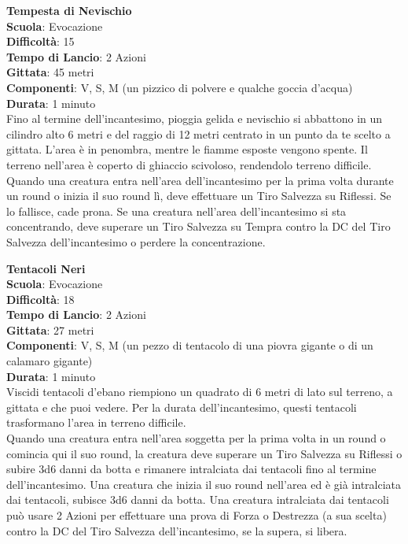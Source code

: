 \begin{multicols}{2}
\medskip\textbf{Tempesta di Nevischio}\\
\textbf{Scuola}: Evocazione\\
\textbf{Difficoltà}: 15\\
\textbf{Tempo di Lancio}: 2 Azioni\\
\textbf{Gittata}: 45 metri\\
\textbf{Componenti}: V, S, M (un pizzico di polvere e qualche goccia d'acqua)\\
\textbf{Durata}: 1 minuto\\
Fino al termine dell'incantesimo, pioggia gelida e nevischio si abbattono in un cilindro alto 6 metri e del raggio di 12 metri centrato in un punto da te scelto a gittata. L'area è in penombra, mentre le fiamme esposte vengono spente. Il terreno nell'area è coperto di ghiaccio scivoloso, rendendolo terreno difficile. Quando una creatura entra nell'area dell'incantesimo per la prima volta durante un round o inizia il suo round lì, deve effettuare un Tiro Salvezza su Riflessi. Se lo fallisce, cade prona. Se una creatura nell'area dell'incantesimo si sta concentrando, deve superare un Tiro Salvezza su Tempra contro la DC del Tiro Salvezza dell'incantesimo o perdere la concentrazione. 

\medskip\textbf{Tentacoli Neri}\\
\textbf{Scuola}: Evocazione\\
\textbf{Difficoltà}: 18\\
\textbf{Tempo di Lancio}: 2 Azioni\\
\textbf{Gittata}: 27 metri\\
\textbf{Componenti}: V, S, M (un pezzo di tentacolo di una piovra gigante o di un calamaro gigante)\\
\textbf{Durata}: 1 minuto\\
Viscidi tentacoli d'ebano riempiono un quadrato di 6 metri di lato sul terreno, a gittata e che puoi vedere. Per la durata dell'incantesimo, questi tentacoli trasformano l'area in terreno difficile.\\
Quando una creatura entra nell'area soggetta per la prima volta in un round o comincia qui il suo round, la creatura deve superare un Tiro Salvezza su Riflessi o subire 3d6 danni da botta e rimanere intralciata dai tentacoli fino al termine dell'incantesimo. Una creatura che inizia il suo round nell'area ed è già intralciata dai tentacoli, subisce 3d6 danni da botta. Una creatura intralciata dai tentacoli può usare 2 Azioni per effettuare una prova di Forza o Destrezza (a sua scelta) contro la DC del Tiro Salvezza dell'incantesimo, se la supera, si libera.


\end{multicols}
